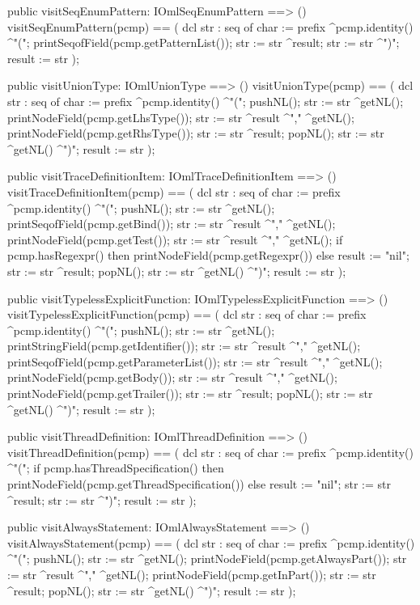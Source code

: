 \begin{vdm_al}
  public visitSeqEnumPattern: IOmlSeqEnumPattern ==> ()
  visitSeqEnumPattern(pcmp) ==
    ( dcl str : seq of char := prefix ^pcmp.identity() ^"(";
      printSeqofField(pcmp.getPatternList());
      str := str ^result;
      str := str ^")";
      result := str );

  public visitUnionType: IOmlUnionType ==> ()
  visitUnionType(pcmp) ==
    ( dcl str : seq of char := prefix ^pcmp.identity() ^"(";
      pushNL();
      str := str ^getNL();
      printNodeField(pcmp.getLhsType());
      str := str ^result ^"," ^getNL();
      printNodeField(pcmp.getRhsType());
      str := str ^result;
      popNL();
      str := str ^getNL() ^")";
      result := str );

  public visitTraceDefinitionItem: IOmlTraceDefinitionItem ==> ()
  visitTraceDefinitionItem(pcmp) ==
    ( dcl str : seq of char := prefix ^pcmp.identity() ^"(";
      pushNL();
      str := str ^getNL();
      printSeqofField(pcmp.getBind());
      str := str ^result ^"," ^getNL();
      printNodeField(pcmp.getTest());
      str := str ^result ^"," ^getNL();
      if pcmp.hasRegexpr()
      then printNodeField(pcmp.getRegexpr())
      else result := "nil";
      str := str ^result;
      popNL();
      str := str ^getNL() ^")";
      result := str );

  public visitTypelessExplicitFunction: IOmlTypelessExplicitFunction ==> ()
  visitTypelessExplicitFunction(pcmp) ==
    ( dcl str : seq of char := prefix ^pcmp.identity() ^"(";
      pushNL();
      str := str ^getNL();
      printStringField(pcmp.getIdentifier());
      str := str ^result ^"," ^getNL();
      printSeqofField(pcmp.getParameterList());
      str := str ^result ^"," ^getNL();
      printNodeField(pcmp.getBody());
      str := str ^result ^"," ^getNL();
      printNodeField(pcmp.getTrailer());
      str := str ^result;
      popNL();
      str := str ^getNL() ^")";
      result := str );

  public visitThreadDefinition: IOmlThreadDefinition ==> ()
  visitThreadDefinition(pcmp) ==
    ( dcl str : seq of char := prefix ^pcmp.identity() ^"(";
      if pcmp.hasThreadSpecification()
      then printNodeField(pcmp.getThreadSpecification())
      else result := "nil";
      str := str ^result;
      str := str ^")";
      result := str );

  public visitAlwaysStatement: IOmlAlwaysStatement ==> ()
  visitAlwaysStatement(pcmp) ==
    ( dcl str : seq of char := prefix ^pcmp.identity() ^"(";
      pushNL();
      str := str ^getNL();
      printNodeField(pcmp.getAlwaysPart());
      str := str ^result ^"," ^getNL();
      printNodeField(pcmp.getInPart());
      str := str ^result;
      popNL();
      str := str ^getNL() ^")";
      result := str );


\end{vdm_al}
